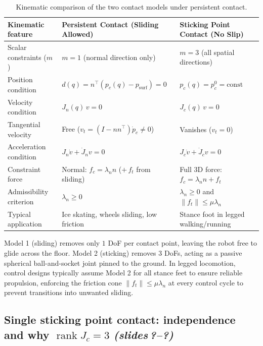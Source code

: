 \documentclass[11pt,a4paper]{article}
\newcommand{\sr}{\emph{(slides\,?--?)}}
\newcommand{\Jc}{J_c}
\DeclareMathOperator{\rank}{rank}
\begin{document}
\begin{table}[ht]
\centering
\small
\renewcommand{\arraystretch}{1.25}
\begin{tabular}{@{}p{3.4cm}p{5.5cm}p{5.5cm}@{}}
\toprule
\textbf{Kinematic feature} & \textbf{Persistent Contact (Sliding Allowed)} & \textbf{Sticking Point Contact (No Slip)} \\
\midrule
Scalar constraints ($m$) & $m = 1$ (normal direction only) & $m = 3$ (all spatial directions) \\
Position condition & $d(q) = n^\top(p_c(q) - p_{\text{surf}}) = 0$ & $p_c(q) = p_c^0 = \text{const}$ \\
Velocity condition & $J_n(q)\,v = 0$ & $\Jc(q)\,v = 0$ \\
Tangential velocity & Free ($v_t = (I - n n^\top)\dot p_c \neq 0$) & Vanishes ($v_t = 0$) \\
Acceleration condition & $J_n\dot v + \dot J_n v = 0$ & $\Jc\dot v + \dot J_c v = 0$ \\
Constraint force & Normal: $f_c = \lambda_n n$ ($+\,f_t$ from sliding) & Full 3D force: $f_c = \lambda_n n + f_t$ \\
Admissibility criterion & $\lambda_n \ge 0$ & $\lambda_n \ge 0$ and $\|f_t\| \le \mu\lambda_n$ \\
Typical application & Ice skating, wheels sliding, low friction & Stance foot in legged walking/running \\
\bottomrule
\end{tabular}
\caption{Kinematic comparison of the two contact models under persistent contact.}
\label{tab:two_contact_models}
\end{table}

\begin{intuition}
Model 1 (sliding) removes only $1$ DoF per contact point, leaving the robot free to glide across the floor. Model 2 (sticking) removes $3$ DoFs, acting as a passive spherical ball-and-socket joint pinned to the ground. In legged locomotion, control designs typically assume Model 2 for all stance feet to ensure reliable propulsion, enforcing the friction cone $\|f_t\|\le\mu\lambda_n$ at every control cycle to prevent transitions into unwanted sliding.
\end{intuition}

\subsection{Single sticking point contact: independence and why $\rank J_c=3$ \sr}
\end{document}
